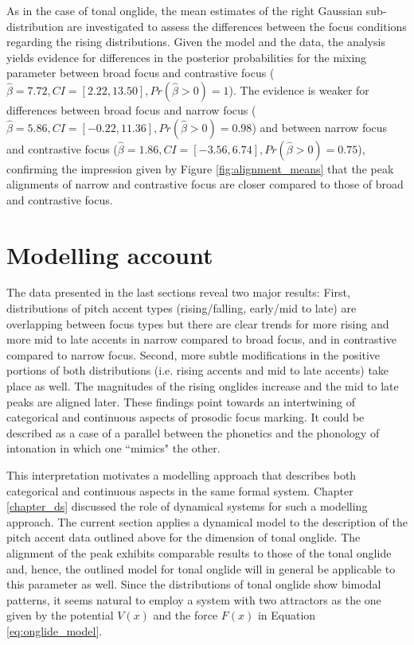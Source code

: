 As in the case of tonal onglide, the mean estimates of the right Gaussian sub-distribution are investigated to assess the differences between the focus conditions regarding the rising distributions. Given the model and the data, the analysis yields evidence for differences in the posterior probabilities for the mixing parameter between broad focus and contrastive focus ($\hat\beta=7.72, CI=[2.22, 13.50], \allowbreak Pr(\hat\beta>0)=1$). The evidence is weaker for differences between broad focus and narrow focus ($\hat\beta=5.86, CI=[-0.22, 11.36], \allowbreak Pr(\hat\beta>0)=0.98$) and between narrow focus and contrastive focus ($\hat\beta=1.86, CI=[-3.56, 6.74], \allowbreak Pr(\hat\beta>0)=0.75$), confirming the impression given by Figure \ref{fig:alignment_means} that the peak alignments of narrow and contrastive focus are closer compared to those of broad and contrastive focus.

\section{Modelling account}

The data presented in the last sections reveal two major results: First, distributions of pitch accent types (rising/falling, early/mid to late) are overlapping between focus types but there are clear trends for more rising and more mid to late accents in narrow compared to broad focus, and in contrastive compared to narrow focus. Second, more subtle modifications in the positive portions of both distributions (i.e. rising accents and mid to late accents) take place as well. The magnitudes of the rising onglides increase and the mid to late peaks are aligned later. These findings point towards an intertwining of categorical and continuous aspects of prosodic focus marking. It could be described as a case of a parallel between the phonetics and the phonology of intonation in which one ``mimics" the other.

This interpretation motivates a modelling approach that describes both categorical and continuous aspects in the same formal system. Chapter \ref{chapter_ds} discussed the role of dynamical systems for such a modelling approach. The current section applies a dynamical model to the description of the pitch accent data outlined above for the dimension of tonal onglide. The alignment of the peak exhibits comparable results to those of the tonal onglide and, hence, the outlined model for tonal onglide will in general be applicable to this parameter as well. Since the distributions of tonal onglide show bimodal patterns, it seems natural to employ a system with two attractors as the one given by the potential $V(x)$ and the force $F(x)$ in Equation \ref{eq:onglide_model}. 


